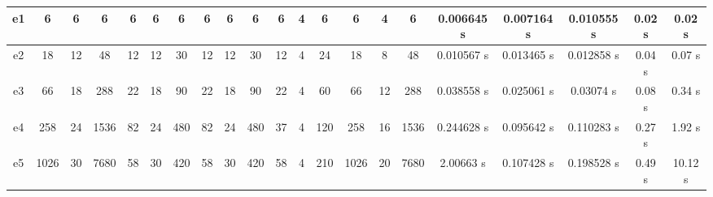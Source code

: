 \begin{table}[]
\begin{tabular}{@{}|c|c|c|c|c|c|c|c|c|c|c|c|c|c|c|c|ccccc@{}}
e1    & 6       & 6                         & 6                             & 6                            & 6    & 6        & 6                            & 6                         & 6                             & 6       & 4                         & 6                             & 6       & 4                         & 6                             & \multicolumn{1}{c|}{0.006645 s}         & \multicolumn{1}{c|}{0.007164 s}         & \multicolumn{1}{c|}{0.010555 s}          & \multicolumn{1}{c|}{0.02 s}          & \multicolumn{1}{c|}{0.02 s}             \\ \midrule
e2    & 18      & 12                        & 48                            & 12                           & 12   & 30       & 12                           & 12                        & 30                            & 12      & 4                         & 24                            & 18      & 8                         & 48                            & \multicolumn{1}{c|}{0.010567 s}         & \multicolumn{1}{c|}{0.013465 s}         & \multicolumn{1}{c|}{0.012858 s}          & \multicolumn{1}{c|}{0.04 s}          & \multicolumn{1}{c|}{0.07 s}             \\ \midrule
e3    & 66      & 18                        & 288                           & 22                           & 18   & 90       & 22                           & 18                        & 90                            & 22      & 4                         & 60                            & 66      & 12                        & 288                           & \multicolumn{1}{c|}{0.038558 s}         & \multicolumn{1}{c|}{0.025061 s}         & \multicolumn{1}{c|}{0.03074 s}           & \multicolumn{1}{c|}{0.08 s}          & \multicolumn{1}{c|}{0.34 s}             \\ \midrule
e4    & 258     & 24                        & 1536                          & 82                           & 24   & 480      & 82                           & 24                        & 480                           & 37      & 4                         & 120                           & 258     & 16                        & 1536                          & \multicolumn{1}{c|}{0.244628 s}         & \multicolumn{1}{c|}{0.095642 s}         & \multicolumn{1}{c|}{0.110283 s}          & \multicolumn{1}{c|}{0.27 s}          & \multicolumn{1}{c|}{1.92 s}             \\ \midrule
e5    & 1026    & 30                        & 7680                          & 58                           & 30   & 420      & 58                           & 30                        & 420                           & 58      & 4                         & 210                           & 1026    & 20                        & 7680                          & \multicolumn{1}{c|}{2.00663 s}          & \multicolumn{1}{c|}{0.107428 s}         & \multicolumn{1}{c|}{0.198528 s}          & \multicolumn{1}{c|}{0.49 s}          & \multicolumn{1}{c|}{10.12 s}            \\ \midrule

\end{tabular}
\end{table}
